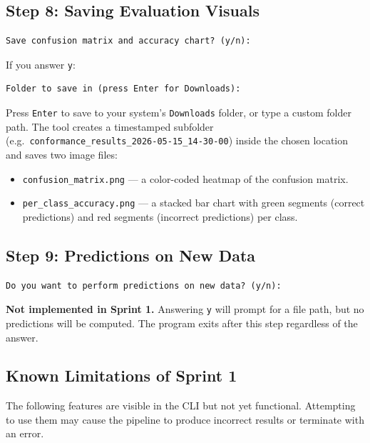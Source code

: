 \documentclass[12pt,a4paper]{article}
\begin{document}
\subsection{Step 8: Saving Evaluation Visuals}
\begin{verbatim}
Save confusion matrix and accuracy chart? (y/n):
\end{verbatim}

If you answer \texttt{y}:
\begin{verbatim}
Folder to save in (press Enter for Downloads):
\end{verbatim}
Press \texttt{Enter} to save to your system's \texttt{Downloads} folder, or type a custom folder path. The tool creates a timestamped subfolder \\(e.g.\ \verb|conformance_results_2026-05-15_14-30-00|) inside the chosen location and saves two image files:
\begin{itemize}
    \item \texttt{confusion\_matrix.png} --- a color-coded heatmap of the confusion matrix.
    \item \texttt{per\_class\_accuracy.png} --- a stacked bar chart with green segments (correct predictions) and red segments (incorrect predictions) per class.
\end{itemize}

\subsection{Step 9: Predictions on New Data}
\begin{verbatim}
Do you want to perform predictions on new data? (y/n):
\end{verbatim}

\textbf{Not implemented in Sprint 1.} Answering \texttt{y} will prompt for a file path, but no predictions will be computed. The program exits after this step regardless of the answer.

\subsection{Known Limitations of Sprint 1}
The following features are visible in the CLI but not yet functional. Attempting to use them may cause the pipeline to produce incorrect results or terminate with an error.
\end{document}
